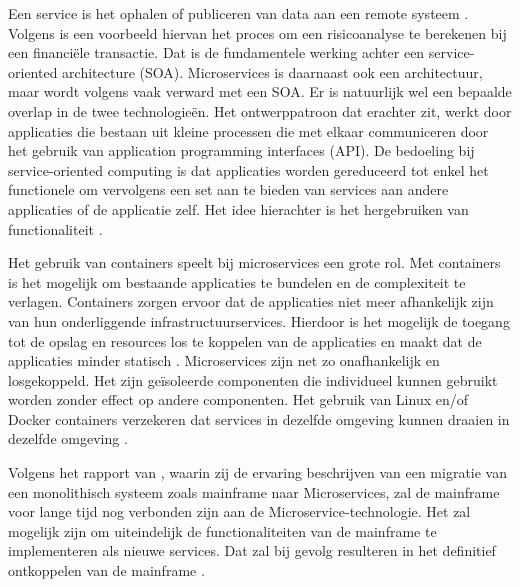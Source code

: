 Een service is het ophalen of publiceren van data aan een remote systeem \autocite{Linthicum2016}. Volgens \textcite{Linthicum2016} is een voorbeeld hiervan het proces om een risicoanalyse te berekenen bij een financiële transactie. Dat is de fundamentele werking achter een service-oriented architecture (SOA). Microservices is daarnaast ook een architectuur, maar wordt volgens \textcite{Linthicum2016} vaak verward met een SOA. Er is natuurlijk wel een bepaalde overlap in de twee technologieën. Het ontwerppatroon dat erachter zit, werkt door applicaties die bestaan uit kleine processen die met elkaar communiceren door het gebruik van application programming interfaces (API). De bedoeling bij service-oriented computing is dat applicaties worden gereduceerd tot enkel het functionele om vervolgens een set aan te bieden van services aan andere applicaties of de applicatie zelf. Het idee hierachter is het hergebruiken van functionaliteit \autocite{Linthicum2016}. 

Het gebruik van containers speelt bij microservices een grote rol. Met containers is het mogelijk om bestaande applicaties te bundelen en de complexiteit te verlagen. Containers zorgen ervoor dat de applicaties niet meer afhankelijk zijn van hun onderliggende infrastructuurservices. Hierdoor is het mogelijk de toegang tot de opslag en resources los te koppelen van de applicaties en maakt dat de applicaties minder statisch \autocite{Linthicum2016a}. Microservices zijn net zo onafhankelijk en losgekoppeld. Het zijn geïsoleerde componenten die individueel kunnen gebruikt worden zonder effect op andere componenten. Het gebruik van Linux en/of Docker containers verzekeren dat services in dezelfde omgeving kunnen draaien in dezelfde omgeving \autocite{Bucchiarone2018}.

Volgens het rapport van \textcite{Bucchiarone2018}, waarin zij de ervaring beschrijven van een migratie van een monolithisch systeem zoals mainframe naar Microservices, zal de mainframe voor lange tijd nog verbonden zijn aan de Microservice-technologie. Het zal mogelijk zijn om uiteindelijk de functionaliteiten van de mainframe te implementeren als nieuwe services. Dat zal bij gevolg resulteren in het definitief ontkoppelen van de mainframe \autocite{Bucchiarone2018}. 


\subsection{}
\label{sec:Workloads migreren naar de cloud}

